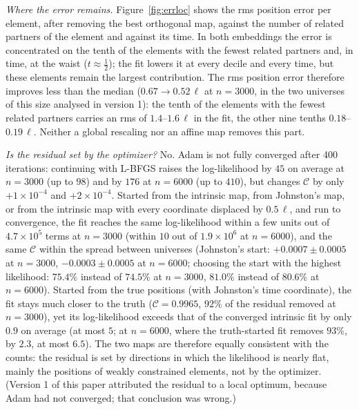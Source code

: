 \documentclass[prd,twocolumn,superscriptaddress,nofootinbib,amsmath,amssymb,floatfix]{revtex4-2}
\begin{document}
\emph{Where the error remains.} Figure~\ref{fig:errloc} shows the rms position error per element, after removing the best orthogonal map, against the number of related partners of the element and against its time. In both embeddings the error is concentrated on the tenth of the elements with the fewest related partners and, in time, at the waist ($t\approx\tfrac12$); the fit lowers it at every decile and every time, but these elements remain the largest contribution. The rms position error therefore improves less than the median ($0.67\to0.52\,\ell$ at $n=3000$, in the two universes of this size analysed in version 1): the tenth of the elements with the fewest related partners carries an rms of $1.4$--$1.6\,\ell$ in the fit, the other nine tenths $0.18$--$0.19\,\ell$. Neither a global rescaling nor an affine map removes this part.

\emph{Is the residual set by the optimizer?} No. Adam is not fully converged after 400 iterations: continuing with L-BFGS raises the log-likelihood by $45$ on average at $n=3000$ (up to $98$) and by $176$ at $n=6000$ (up to $410$), but changes $\mathcal C$ by only $+1\times10^{-4}$ and $+2\times10^{-4}$. Started from the intrinsic map, from Johnston's map, or from the intrinsic map with every coordinate displaced by $0.5\,\ell$, and run to convergence, the fit reaches the same log-likelihood within a few units out of $4.7\times10^5$ terms at $n=3000$ (within $10$ out of $1.9\times10^6$ at $n=6000$), and the same $\mathcal C$ within the spread between universes (Johnston's start: $+0.0007\pm0.0005$ at $n=3000$, $-0.0003\pm0.0005$ at $n=6000$; choosing the start with the highest likelihood: $75.4\%$ instead of $74.5\%$ at $n=3000$, $81.0\%$ instead of $80.6\%$ at $n=6000$). Started from the true positions (with Johnston's time coordinate), the fit stays much closer to the truth ($\mathcal C=0.9965$, $92\%$ of the residual removed at $n=3000$), yet its log-likelihood exceeds that of the converged intrinsic fit by only $0.9$ on average (at most $5$; at $n=6000$, where the truth-started fit removes $93\%$, by $2.3$, at most $6.5$). The two maps are therefore equally consistent with the counts: the residual is set by directions in which the likelihood is nearly flat, mainly the positions of weakly constrained elements, not by the optimizer. (Version 1 of this paper attributed the residual to a local optimum, because Adam had not converged; that conclusion was wrong.)
\end{document}
